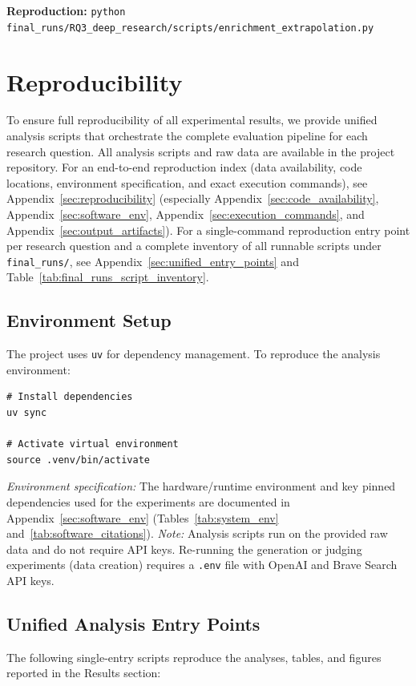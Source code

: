 \textbf{Reproduction:} \texttt{python final\_runs/RQ3\_deep\_research/scripts/enrichment\_extrapolation.py}

\section{Reproducibility}
\label{sec:reproduction}

To ensure full reproducibility of all experimental results, we provide unified analysis scripts that orchestrate the complete evaluation pipeline for each research question. All analysis scripts and raw data are available in the project repository.
For an end-to-end reproduction index (data availability, code locations, environment specification, and exact execution commands), see Appendix~\ref{sec:reproducibility} (especially Appendix~\ref{sec:code_availability}, Appendix~\ref{sec:software_env}, Appendix~\ref{sec:execution_commands}, and Appendix~\ref{sec:output_artifacts}).
For a single-command reproduction entry point per research question and a complete inventory of all runnable scripts under \texttt{final\_runs/}, see Appendix~\ref{sec:unified_entry_points} and Table~\ref{tab:final_runs_script_inventory}.

\subsection{Environment Setup}
The project uses \texttt{uv} for dependency management. To reproduce the analysis environment:
\begin{verbatim}
# Install dependencies
uv sync

# Activate virtual environment
source .venv/bin/activate
\end{verbatim}
\textit{Environment specification:} The hardware/runtime environment and key pinned dependencies used for the experiments are documented in Appendix~\ref{sec:software_env} (Tables~\ref{tab:system_env} and~\ref{tab:software_citations}).
\textit{Note:} Analysis scripts run on the provided raw data and do not require API keys. Re-running the generation or judging experiments (data creation) requires a \texttt{.env} file with OpenAI and Brave Search API keys.

\subsection{Unified Analysis Entry Points}
The following single-entry scripts reproduce the analyses, tables, and figures reported in the Results section:

